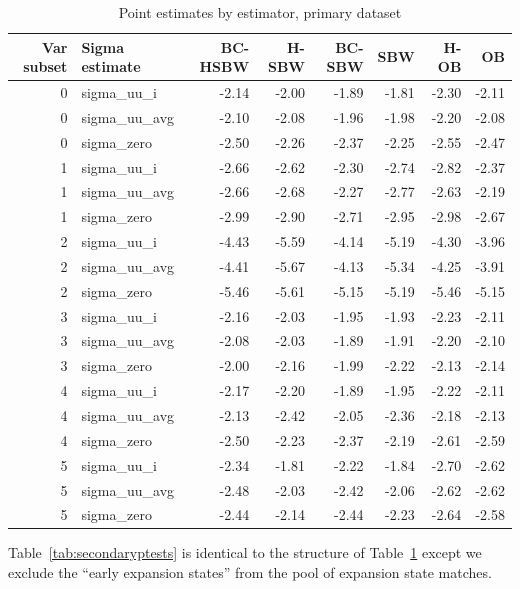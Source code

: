 \documentclass[12pt]{article}
\begin{document}
\begin{table}[ht]
\begin{tabular}{rlrrrrrr}
  \toprule
Var subset & Sigma estimate & BC-HSBW & H-SBW & BC-SBW & SBW & H-OB & OB \\ 
  \midrule
0 & sigma\_uu\_i & -2.14 & -2.00 & -1.89 & -1.81 & -2.30 & -2.11 \\ 
  0 & sigma\_uu\_avg & -2.10 & -2.08 & -1.96 & -1.98 & -2.20 & -2.08 \\ 
  0 & sigma\_zero & -2.50 & -2.26 & -2.37 & -2.25 & -2.55 & -2.47 \\ 
  1 & sigma\_uu\_i & -2.66 & -2.62 & -2.30 & -2.74 & -2.82 & -2.37 \\ 
  1 & sigma\_uu\_avg & -2.66 & -2.68 & -2.27 & -2.77 & -2.63 & -2.19 \\ 
  1 & sigma\_zero & -2.99 & -2.90 & -2.71 & -2.95 & -2.98 & -2.67 \\ 
  2 & sigma\_uu\_i & -4.43 & -5.59 & -4.14 & -5.19 & -4.30 & -3.96 \\ 
  2 & sigma\_uu\_avg & -4.41 & -5.67 & -4.13 & -5.34 & -4.25 & -3.91 \\ 
  2 & sigma\_zero & -5.46 & -5.61 & -5.15 & -5.19 & -5.46 & -5.15 \\ 
  3 & sigma\_uu\_i & -2.16 & -2.03 & -1.95 & -1.93 & -2.23 & -2.11 \\ 
  3 & sigma\_uu\_avg & -2.08 & -2.03 & -1.89 & -1.91 & -2.20 & -2.10 \\ 
  3 & sigma\_zero & -2.00 & -2.16 & -1.99 & -2.22 & -2.13 & -2.14 \\ 
  4 & sigma\_uu\_i & -2.17 & -2.20 & -1.89 & -1.95 & -2.22 & -2.11 \\ 
  4 & sigma\_uu\_avg & -2.13 & -2.42 & -2.05 & -2.36 & -2.18 & -2.13 \\ 
  4 & sigma\_zero & -2.50 & -2.23 & -2.37 & -2.19 & -2.61 & -2.59 \\ 
  5 & sigma\_uu\_i & -2.34 & -1.81 & -2.22 & -1.84 & -2.70 & -2.62 \\ 
  5 & sigma\_uu\_avg & -2.48 & -2.03 & -2.42 & -2.06 & -2.62 & -2.62 \\ 
  5 & sigma\_zero & -2.44 & -2.14 & -2.44 & -2.23 & -2.64 & -2.58 \\ 
   \bottomrule
\end{tabular}
\caption{Point estimates by estimator, primary dataset}
\label{tab:ptests}
\end{table}

Table~\ref{tab:secondaryptests} is identical to the structure of Table~\ref{tab:ptests} except we exclude the ``early expansion states'' from the pool of expansion state matches.
\end{document}
